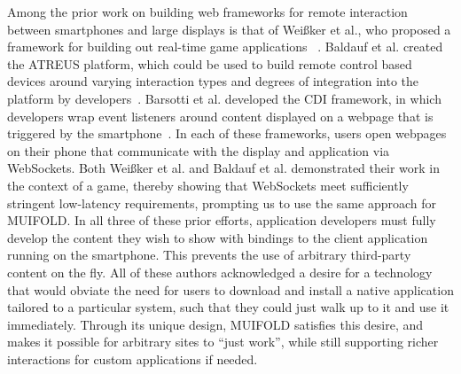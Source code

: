 Among the prior work on building web frameworks for remote interaction between smartphones and large displays is that of
Weißker et al., who proposed a
framework for building out real-time game applications ~\cite{weisker_massive_2016}. Baldauf et al. created the ATREUS
platform, which could be used to build remote control based
devices around varying interaction types and degrees of integration
into the platform by developers~\cite{baldauf_your_2016}. Barsotti
et al. developed the CDI framework, in which developers wrap event listeners around content displayed on a webpage
that is triggered by the smartphone~\cite{barsotti_web_2017}.
In each of these frameworks, users open webpages on their phone that communicate with the display and application via WebSockets.
Both Weißker et al. and Baldauf et al. demonstrated their
work in the context of a game, thereby showing that
WebSockets meet sufficiently stringent low-latency requirements, prompting us to use the same approach for MUIFOLD. In all
three of these prior efforts, application
developers must fully develop the content they wish to show with bindings to the client application running on the smartphone. This prevents the use of arbitrary third-party content on the fly.
All of these authors acknowledged a desire for a technology that would obviate the need for users to download and install a native application tailored to a particular system, such that they could just walk up to it and use it immediately. Through its unique design, MUIFOLD satisfies this desire, and makes it possible for arbitrary sites to ``just work'', while still supporting richer interactions for custom applications if needed.
